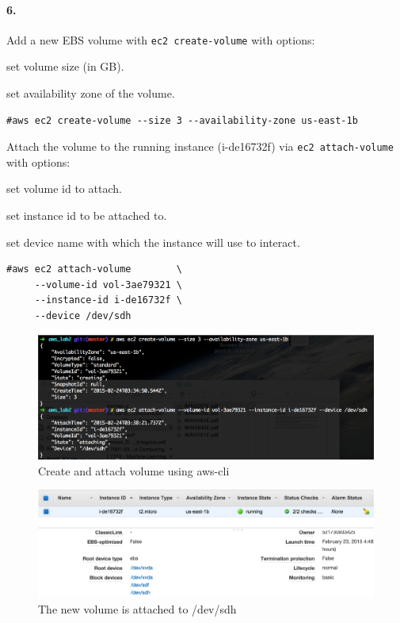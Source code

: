 \documentclass[a4paper]{article}
\begin{document}
\paragraph{6. } Add a new EBS volume with \texttt{ec2 create-volume} with options:
\begin{description}
\leftskip 0.4in
\parindent -0.4in
	\item[\texttt{--size} : ] set volume size (in GB).
	\item[\texttt{--availability-zone} : ] set availability zone of the volume.
\end{description}
\begin{verbatim}
#aws ec2 create-volume --size 3 --availability-zone us-east-1b
\end{verbatim}

Attach the volume to the running instance (i-de16732f) via \texttt{ec2 attach-volume} with options:
\begin{description}
\leftskip 0.4in
\parindent -0.4in
	\item[\texttt{--volume-id} : ] set volume id to attach.
	\item[\texttt{--instance-id} : ] set instance id to be attached to.
	\item[\texttt{--device} : ] set device name with which the instance will use to interact.
\end{description}
\begin{verbatim}
#aws ec2 attach-volume        \
     --volume-id vol-3ae79321 \
     --instance-id i-de16732f \
     --device /dev/sdh
\end{verbatim}
\begin{figure}[H]
  \centering
    \includegraphics[scale=.4]{attaching_volume.png}
  \caption{Create and attach volume using aws-cli}
\end{figure} 
\begin{figure}[H]
  \centering
    \includegraphics[scale=.4]{attached_volume.png}
  \caption{The new volume is attached to /dev/sdh}
\end{figure} 
\end{document}
